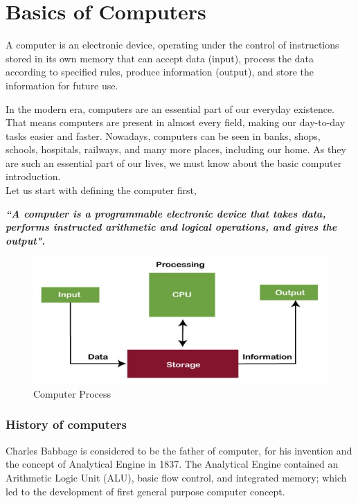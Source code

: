 \documentclass[11pt,a4paper,twoside]{article}
\begin{document}
\part{Basics of Computers}
A computer is an electronic device, operating under the control of instructions stored in its own memory that can accept data (input), process the data according to specified rules, produce information (output), and store the information for future use.\par
In the modern era, computers are an essential part of our everyday existence. That means computers are present in almost every field, making our day-to-day tasks easier and faster. Nowadays, computers can be seen in banks, shops, schools, hospitals, railways, and many more places, including our home. As they are such an essential part of our lives, we must know about the basic computer introduction.\\
Let us start with defining the computer first,\par
\textbf{\emph{``A computer is a programmable electronic device that takes data, performs instructed arithmetic and logical operations, and gives the output".}}
\begin{figure}[H]
\includegraphics[width=1\textwidth]{Fig 1.jpg}
\caption{Computer Process}
\end{figure}
\section{History of computers}
Charles Babbage is considered to be the father of computer, for his invention
and the concept of Analytical Engine in 1837. The Analytical Engine contained an Arithmetic Logic Unit (ALU), basic flow control, and integrated memory; which led to the development of first general purpose computer concept.
\end{document}
